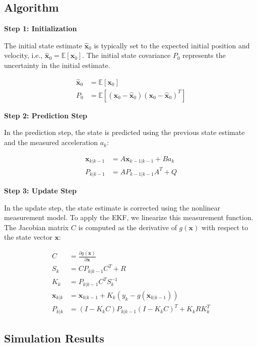 \subsection{Algorithm}

\textbf{Step 1: Initialization}

The initial state estimate \( \hat{\mathbf{x}}_0 \) is typically set to the expected 
initial position and velocity, i.e., \( \hat{\mathbf{x}}_0 = \mathbb{E}[\mathbf{x}_0] \). 
The initial state covariance \( P_0 \) represents the uncertainty in the initial estimate.

\begin{align}
    \hat{\mathbf{x}}_0 &= \mathbb{E}[\mathbf{x}_0] \\
    P_0 &= \mathbb{E}[(\mathbf{x}_0 - \hat{\mathbf{x}}_0)(\mathbf{x}_0 - \hat{\mathbf{x}}_0)^T]
\end{align}

\textbf{Step 2: Prediction Step}

In the prediction step, the state is predicted using the previous state 
estimate and the measured acceleration \( a_k \):

\begin{align}
    \mathbf{x}_{k|k-1} &= A \mathbf{x}_{k-1|k-1} + B a_k \\
    P_{k|k-1} &= A P_{k-1|k-1} A^T + Q
\end{align}

\clearpage

\textbf{Step 3: Update Step}


In the update step, the state estimate is corrected using the nonlinear measurement model. To apply the EKF, we linearize this measurement function. The Jacobian matrix \( C \) is computed as the derivative of \( g(\mathbf{x}) \) with respect to the state vector \( \mathbf{x} \):

\begin{align}
    C &= \frac{\partial g(\mathbf{x})}{\partial \mathbf{x}} \\
    S_k &= C P_{k|k-1} C^T + R \\
    K_k &= P_{k|k-1} C^T S_k^{-1} \\
    \mathbf{x}_{k|k} &= \mathbf{x}_{k|k-1} + K_k \left( y_k - g(\mathbf{x}_{k|k-1}) \right) \\
    P_{k|k} &= (I - K_k C) P_{k|k-1} (I - K_k C)^T + K_k R K_k^T
\end{align}

\subsection{Simulation Results}

